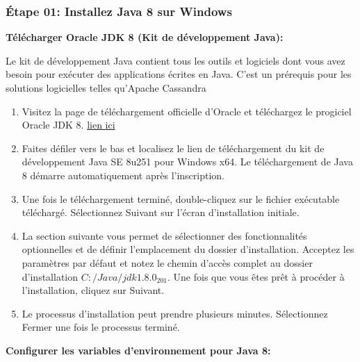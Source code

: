 \subsubsection {Étape 01:  Installez Java 8 sur Windows}

\textbf{Télécharger Oracle JDK 8 (Kit de développement Java):}

Le kit de développement Java contient tous les outils et logiciels dont vous avez besoin pour exécuter des applications écrites en Java. C'est un prérequis pour les solutions logicielles telles qu'Apache Cassandra

\begin{enumerate}
\item Visitez la page de téléchargement officielle d'Oracle et téléchargez le progiciel Oracle JDK 8. \href{https://www.oracle.com/java/technologies/javase/javase-jdk8-downloads.html}{lien ici}

\item Faites défiler vers le bas et localisez le lien de téléchargement du kit de développement Java SE 8u251 pour Windows x64. Le téléchargement de Java 8 démarre automatiquement après l'inscription.

\item Une fois le téléchargement terminé, double-cliquez sur le fichier exécutable téléchargé. Sélectionnez Suivant sur l'écran d'installation initiale.

\item La section suivante vous permet de sélectionner des fonctionnalités optionnelles et de définir l'emplacement du dossier d'installation. Acceptez les paramètres par défaut et notez le chemin d'accès complet au dossier d'installation $C:/Java/jdk1.8.0_201$. Une fois que vous êtes prêt à procéder à l'installation, cliquez sur Suivant.

\item Le processus d'installation peut prendre plusieurs minutes. Sélectionnez Fermer une fois le processus terminé.

\end{enumerate}

\textbf{Configurer les variables d'environnement pour Java 8:}


